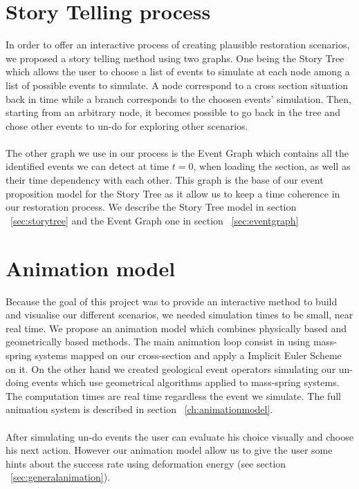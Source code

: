 \documentclass[12pt, a4paper]{report} %
\begin{document}
\section{Story Telling process}
\label{sub:storytel}
In order to offer an interactive process of creating plausible restoration scenarios, we proposed a story telling method using two graphs. One being the Story Tree which allows the user to choose a list of events to simulate at each node among a list of possible events to simulate. A node correspond to a cross section situation back in time while a branch corresponds to the choosen events' simulation. Then, starting from an arbitrary node, it becomes possible to go back in the tree and chose other events to un-do for exploring other scenarios.\\\\
The other graph we use in our process is the Event Graph which contains all the identified events we can detect at time $t = 0$, when loading the section, as well as their time dependency with each other. This graph is the base of our event proposition model for the Story Tree as it allow us to keep a time coherence in our restoration process. We describe the Story Tree model in section ~\ref{sec:storytree} and the Event Graph one in section ~\ref{sec:eventgraph}
\section{Animation model}
Because the goal of this project was to provide an interactive method to build and visualise our different scenarios, we needed simulation times to be small, near real time. We propose an animation model which combines physically based and geometrically based methods. The main animation loop consist in using mass-spring systems mapped on our cross-section and apply a Implicit Euler Scheme on it. On the other hand we created geological event operators simulating our un-doing events which use geometrical algorithms applied to mass-spring systems. The computation times are real time regardless the event we simulate. The full animation system is described in section ~\ref{ch:animationmodel}.\\\\
After simulating un-do events the user can evaluate his choice visually and choose his next action. However our animation model allow us to give the user some hints about the success rate using deformation energy (see section ~\ref{sec:generalanimation}).
\end{document}
